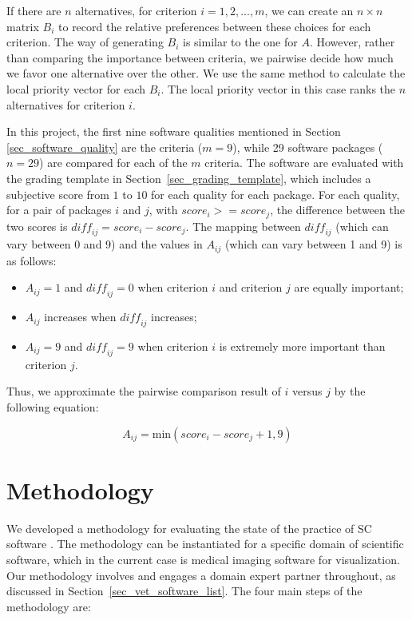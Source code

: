 \documentclass[3p, 12pt,authoryear]{elsarticle}
\begin{document}
If there are $n$ alternatives, for criterion $i = 1, 2, ... , m$, we can create
an $n\times n$ matrix $B_i$ to record the relative preferences between these
choices for each criterion. The way of generating $B_i$ is similar to the one
for $A$. However, rather than comparing the importance between criteria, we
pairwise decide how much we favor one alternative over the other. We use the
same method to calculate the local priority vector for each $B_i$.  The local
priority vector in this case ranks the $n$ alternatives for criterion $i$.

In this project, the first nine software qualities mentioned in Section
\ref{sec_software_quality} are the criteria ($m = 9$), while 29 software
packages ($n = 29$) are compared for each of the $m$ criteria. The software are
evaluated with the grading template in Section~\ref{sec_grading_template}, which
includes a subjective score from $1$ to $10$ for each quality for each package.
For each quality, for a pair of packages $i$ and $j$, with $\mathit{score}_i >=
\mathit{score}_j$, the difference between the two scores is $\mathit{diff_{ij}}
= \mathit{score}_i - \mathit{score}_j$. The mapping between $\mathit{diff_{ij}}$
(which can vary between 0 and 9) and the values in $A_{ij}$ (which can vary
between 1 and 9) is as follows:

\begin{itemize}
\item $A_{ij} = 1$ and $\mathit{diff_{ij}} = 0$ when criterion $i$ and criterion
$j$ are equally important;
\item $A_{ij}$ increases when $\mathit{diff_{ij}}$ increases;
\item $A_{ij} = 9$ and $\mathit{diff_{ij}} = 9$ when criterion $i$ is extremely
more important than criterion $j$.
\end{itemize}

\noindent Thus, we approximate the pairwise comparison result of $i$ versus $j$
by the following equation:

\begin{equation}
A_{ij} = \text{min}(\mathit{score}_i - \mathit{score}_j + 1, 9)
\end{equation}

\section{Methodology} \label{ch_methods}

We developed a methodology for evaluating the state of the practice of SC
software \citep{SmithEtAl2021}.  The  methodology can be instantiated for a
specific domain of scientific software, which in the current case is medical
imaging software for visualization.  Our methodology involves and engages a
domain expert partner throughout, as discussed in
Section~\ref{sec_vet_software_list}.  The four main steps of the methodology are:
\end{document}
